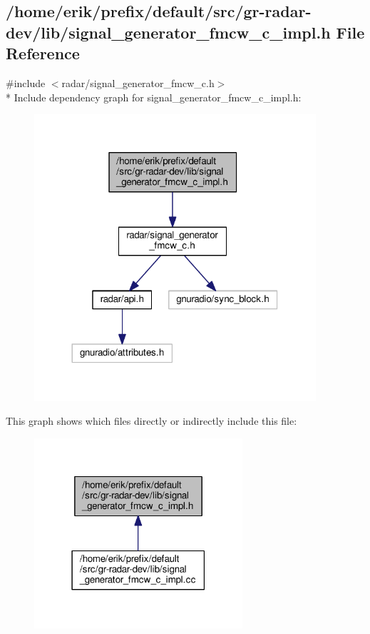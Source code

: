 \subsection{/home/erik/prefix/default/src/gr-\/radar-\/dev/lib/signal\+\_\+generator\+\_\+fmcw\+\_\+c\+\_\+impl.h File Reference}
\label{signal__generator__fmcw__c__impl_8h}
{\ttfamily \#include $<$radar/signal\+\_\+generator\+\_\+fmcw\+\_\+c.\+h$>$}\\*
Include dependency graph for signal\+\_\+generator\+\_\+fmcw\+\_\+c\+\_\+impl.\+h\+:
\nopagebreak
\begin{figure}[H]
\begin{center}
\leavevmode
\includegraphics[width=296pt]{d7/dc9/signal__generator__fmcw__c__impl_8h__incl}
\end{center}
\end{figure}
This graph shows which files directly or indirectly include this file\+:
\nopagebreak
\begin{figure}[H]
\begin{center}
\leavevmode
\includegraphics[width=219pt]{d1/d25/signal__generator__fmcw__c__impl_8h__dep__incl}
\end{center}
\end{figure}
